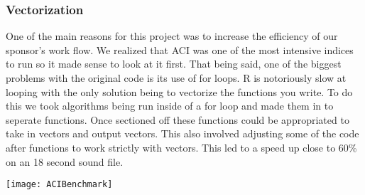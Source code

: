 \subsubsection{Vectorization}
One of the main reasons for this project was to increase the efficiency of our sponsor's work flow. We realized that ACI was one of the most intensive indices to run so it made sense to look at it first. That being said, one of the biggest problems with the original code is its use of for loops. R is notoriously slow at looping with the only solution being to vectorize the functions you write. To do this we took algorithms being run inside of a for loop and made them in to seperate functions. Once sectioned off these functions could be appropriated to take in vectors and output vectors. This also involved adjusting some of the code after functions to work strictly with vectors. This led to a speed up close to 60\% on an 18 second sound file.

\begin{center}
	\texttt{[image: ACIBenchmark]} \\[12pt]
\end{center}

